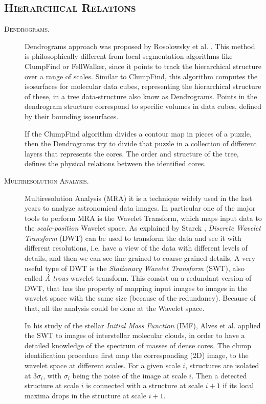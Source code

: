 \documentclass[letter, 11pt]{article}
\begin{document}
\subsection{\textsc{Hierarchical Relations}}

\begin{description}
    \item[\textsc{Dendrograms.}] Dendrograms approach was proposed by Rosolowsky et al. \cite{Rosolowsky}. This method is philosophically different from local segmentation algorithms like ClumpFind or FellWalker, since it points to track the hierarchical structure over a range of scales. Similar to ClumpFind, this algorithm computes the isosurfaces for molecular data cubes, representing the hierarchical structure of these, in a tree data-structure also know as Dendrograms. Points in the dendrogram structure correspond to specific volumes in data cubes, defined by their bounding
    isosurfaces.

    If the ClumpFind algorithm divides a contour map in pieces of a puzzle, then the Dendrograms try to divide that puzzle in a collection of different layers that represents the cores. The order and structure of the tree, defines the physical relations between the identified cores.

    \item[\textsc{Multiresolution Analysis.}] Multiresolution Analysis (MRA) it is a technique widely used in the last years to analyze astronomical data images. In particular one of the major tools to perform MRA is the Wavelet Transform, which maps input data to the \textit{scale-position} Wavelet space. As explained by Starck \cite{Starck}, \textit{Discrete Wavelet Transform} (DWT) can be used to transform the data and see it with different resolutions, i.e, have a view of the data with different levels of details, and then we can see fine-grained to coarse-grained details. A very useful type of DWT is the \textit{Stationary Wavelet Transform} (SWT), also called \textit{À trous} wavelet transform. This consist on a redundant version of DWT, that has the property of mapping input images to images in the wavelet space with the same size (because of the redundancy). Because of that, all the analysis could be done at the Wavelet space.

    In his study of the stellar \textit{Initial Mass Function} (IMF), Alves et al. \cite{Alves} applied the SWT to images of interstellar molecular clouds, in order to have a detailed knowledge of the spectrum of masses of dense cores. The clump identification procedure first map the corresponding (2D) image, to the wavelet space at different scales. For a given scale $i$, structures are isolated at $3\sigma_i$, with $\sigma_i$ being the noise of the image at scale $i$. Then a detected structure at scale $i$ is connected with a structure at scale $i+1$ if its local maxima drops in the structure at scale $i+1$.


\end{description}
\end{document}
